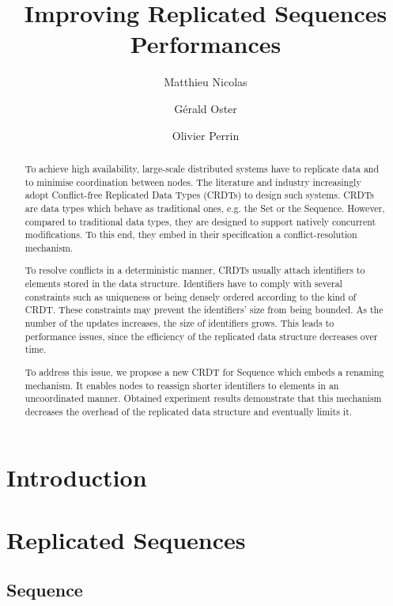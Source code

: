 \documentclass{article}
\newcommand{\removespacebelowalign}[0]{ \setlength{\belowdisplayskip}{-10pt} \setlength{\belowdisplayshortskip}{-10pt}}
\theoremstyle{definition}
\begin{document}
\removespacebelowalign

\title{Improving Replicated Sequences Performances}
\author{Matthieu Nicolas}
\author{Gérald Oster}
\author{Olivier Perrin}
\date{}

\maketitle

\begin{abstract}
To achieve high availability, large-scale distributed systems have to replicate data and to minimise coordination between nodes. The literature and industry increasingly adopt Conflict-free Replicated Data Types (CRDTs) to design such systems. CRDTs are data types which behave as traditional ones, e.g. the Set or the Sequence. However, compared to traditional data types, they are designed to support natively concurrent modifications. To this end, they embed in their specification a conflict-resolution mechanism.

To resolve conflicts in a deterministic manner, CRDTs usually attach identifiers to elements stored in the data structure. Identifiers have to comply with several constraints such as uniqueness or being densely ordered according to the kind of CRDT. These constraints may prevent the identifiers’ size from being bounded. As the number of the updates increases, the size of identifiers grows. This leads to performance issues, since the efficiency of the replicated data structure decreases over time.

To address this issue, we propose a new CRDT for Sequence which embeds a renaming mechanism. It enables nodes to reassign shorter identifiers to elements in an uncoordinated manner. Obtained experiment results demonstrate that this mechanism decreases the overhead of the replicated data structure and eventually limits it.
\end{abstract}

\section{Introduction}

\section{Replicated Sequences}

\subsection{Sequence}
\end{document}
